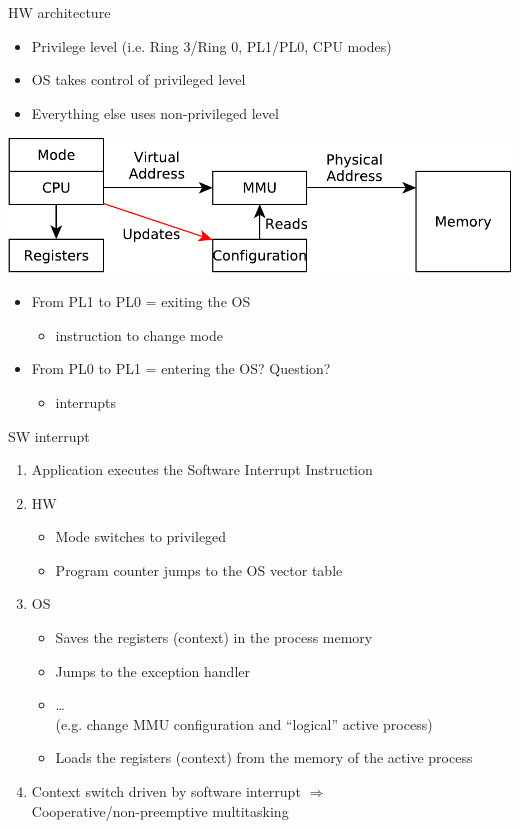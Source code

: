 \documentclass{beamer}
\begin{document}
\begin{frame}{HW architecture}
  \begin{itemize}
  \item Privilege level (i.e. Ring 3/Ring 0, PL1/PL0, CPU modes)
  \item OS takes control of privileged level
  \item Everything else uses non-privileged level
  \end{itemize}
  \begin{center}
  \includegraphics[width=0.5\linewidth]{mode0}
  \end{center}
  \begin{itemize}
  \item<2-> From PL1 to PL0 = exiting the OS
  \begin{itemize}
    \item instruction to change mode
  \end{itemize}
  \item<3-> From PL0 to PL1 = entering the OS? \alert{Question?}
  \begin{itemize}
    \item<4-> interrupts
  \end{itemize}
  \end{itemize}
\end{frame}



\begin{frame}{SW interrupt}
  \begin{enumerate}
  \item<1-> Application executes the Software Interrupt Instruction
  \item<2-> HW
  \begin{itemize}
    \item Mode switches to privileged
    \item Program counter jumps to the OS \alert{vector table}
  \end{itemize}
  \item<3-> OS
  \begin{itemize}
    \item Saves the registers (context) in the process memory
    \item Jumps to the \alert{exception handler}
    \item \dots \\
 (e.g. change MMU configuration and ``logical'' active process)
    \item Loads the registers (context) from the memory of the  \alert{active}
      process
  \end{itemize}
  \item<4-> Context switch driven by software interrupt $\Rightarrow$\\
    Cooperative/non-preemptive multitasking
\end{enumerate}
\end{frame}
\end{document}
